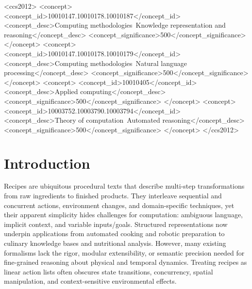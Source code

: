 \documentclass[sigconf]{acmart}
\begin{document}
\begin{CCSXML}
<ccs2012>
   <concept>
       <concept_id>10010147.10010178.10010187</concept_id>
       <concept_desc>Computing methodologies~Knowledge representation and reasoning</concept_desc>
       <concept_significance>500</concept_significance>
       </concept>
   <concept>
       <concept_id>10010147.10010178.10010179</concept_id>
       <concept_desc>Computing methodologies~Natural language processing</concept_desc>
       <concept_significance>500</concept_significance>
       </concept>
   <concept>
       <concept_id>10010405</concept_id>
       <concept_desc>Applied computing</concept_desc>
       <concept_significance>500</concept_significance>
       </concept>
   <concept>
       <concept_id>10003752.10003790.10003794</concept_id>
       <concept_desc>Theory of computation~Automated reasoning</concept_desc>
       <concept_significance>500</concept_significance>
       </concept>
 </ccs2012>
\end{CCSXML}





\maketitle

\section{Introduction}

Recipes are ubiquitous procedural texts that describe multi-step transformations from raw ingredients to finished products. They interleave sequential and concurrent actions, environment changes, and domain-specific techniques, yet their apparent simplicity hides challenges for computation: ambiguous language, implicit context, and variable inputs/goals. Structured representations now underpin applications from automated cooking and robotic preparation to culinary knowledge bases and nutritional analysis. However, many existing formalisms lack the rigor, modular extensibility, or semantic precision needed for fine-grained reasoning about physical and temporal dynamics. Treating recipes as linear action lists often obscures state transitions, concurrency, spatial manipulation, and context-sensitive environmental effects.
\end{document}
